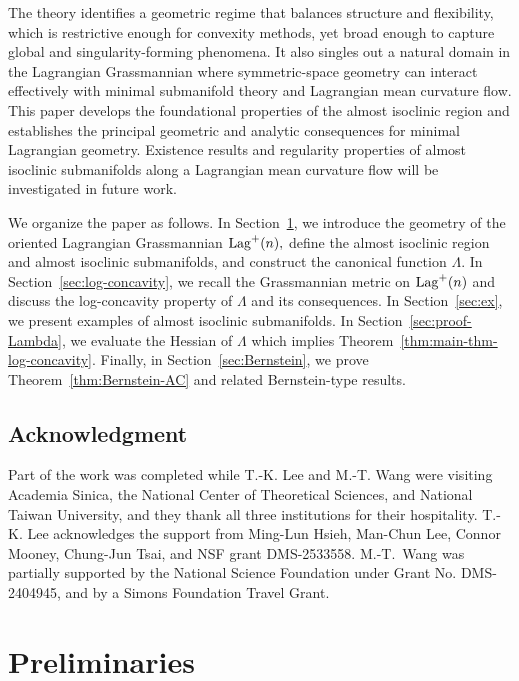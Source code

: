 \documentclass[11pt]{amsart}
\numberwithin{equation}{section}
\theoremstyle{definition}
\theoremstyle{definition}
\begin{document}
The theory identifies a geometric regime that balances structure and flexibility, which is restrictive enough for convexity methods, yet broad enough to capture global and singularity-forming phenomena. 
It also singles out a natural domain in the Lagrangian Grassmannian where symmetric-space geometry can interact effectively with minimal submanifold theory and Lagrangian mean curvature flow.
This paper develops the foundational properties of the almost isoclinic region and establishes the principal geometric and analytic consequences for minimal Lagrangian geometry.
Existence results and regularity properties of almost isoclinic submanifolds along a Lagrangian mean curvature flow will be investigated in future work.




We organize the paper as follows.
In Section~\ref{sec:Pre}, we introduce the geometry of the oriented Lagrangian Grassmannian ${\rm Lag}^+(n),$ define the almost isoclinic region and almost isoclinic submanifolds, and construct the canonical function $\Lambda$.
In Section~\ref{sec:log-concavity}, we recall the Grassmannian metric on ${\rm Lag}^+(n)$ and discuss the log-concavity property of $\Lambda$ and its consequences.
In Section~\ref{sec:ex}, we present examples of almost isoclinic submanifolds.
In Section~\ref{sec:proof-Lambda}, we evaluate the Hessian of $\Lambda$ which implies Theorem~\ref{thm:main-thm-log-concavity}.
Finally, in Section~\ref{sec:Bernstein}, we prove Theorem~\ref{thm:Bernstein-AC} and related Bernstein-type results.

\subsection*{\bf Acknowledgment}
Part of the work was completed while T.-K. Lee and M.-T. Wang were visiting Academia Sinica, the National Center of Theoretical Sciences, and National Taiwan University, and they thank all three institutions for their hospitality. 
T.-K. Lee acknowledges the support from Ming-Lun Hsieh, Man-Chun Lee, Connor Mooney, Chung-Jun Tsai, and NSF grant DMS-2533558.
M.-T.~Wang was partially supported by the National Science Foundation under Grant No. DMS-2404945, and by a Simons Foundation Travel Grant.  




\section{\bf Preliminaries}
\label{sec:Pre}
\end{document}
